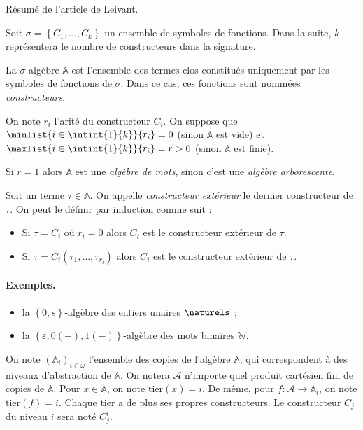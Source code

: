\documentclass{report}
\newcommand{\bbA}{\mathbb{A}}
\begin{document}
		Résumé de l'article \cite{Leivant1995} de Leivant. 
		
		\begin{definition}
			\label{def:algebre}
			Soit $\sigma = \left\lbrace C_1, \dots, C_k \right\rbrace$ un ensemble de symboles de fonctions. Dans la suite, $k$ représentera le nombre de constructeurs dans la signature.
			
			La $\sigma$-algèbre $\bbA$ est l'ensemble des termes clos constitués uniquement par les symboles de fonctions de $\sigma$. Dans ce cas, ces fonctions sont nommées \emph{constructeurs}. 
			
			On note $r_i$ l'arité du constructeur $C_i$. On suppose que $\minlist{i\in\intint{1}{k}}{r_i} = 0$ (sinon $\bbA$ est vide) et $\maxlist{i\in\intint{1}{k}}{r_i} = r > 0$ (sinon $\bbA$ est finie).
			
			Si $r = 1$ alors $\mathbb{A}$ est une \emph{algèbre de mots}, sinon c'est une \emph{algèbre arborescente}.
			
			Soit un terme $\tau \in \bbA$. On appelle \emph{constructeur extérieur} le dernier constructeur de $\tau$. On peut le définir par induction comme suit :
			
			\begin{itemize}[itemsep=-1mm]
				\item 	Si $\tau = C_i$ où $r_i = 0$ alors $C_i$ est le constructeur extérieur de $\tau$.
				\item 	Si $\tau = C_i(\tau_1, \dots, \tau_{r_i})$ alors $C_{i}$ est le constructeur extérieur de $\tau$.
			\end{itemize}
		\end{definition}
		
		
		\paragraph{Exemples.}
		\begin{itemize}[itemsep=-1mm]
			\item 	la $\left\lbrace 0, s \right\rbrace$-algèbre des entiers unaires $\naturels$ ;
			\item 	la $\left\lbrace \varepsilon, 0(-), 1(-)\right\rbrace$-algèbre des mots binaires $\mathbb{W}$.
		\end{itemize}
		
		\espace
		
		
		On note $(\bbA_i)_{i\in \omega}$ l'ensemble des copies de l'algèbre $\bbA$, qui correspondent à des niveaux d'abstraction de $\bbA$. On notera $\mathcal{A}$ n'importe quel produit cartésien fini de copies de $\bbA$. Pour $x\in \bbA$, on note $\text{tier}(x) = i$. De même, pour $f : \mathcal{A} \to \bbA_i$, on note $\text{tier}(f) = i$. Chaque tier a de plus ses propres constructeurs. Le constructeur $C_j$ du niveau $i$ sera noté $C_j^i$. 
		
\end{document}
